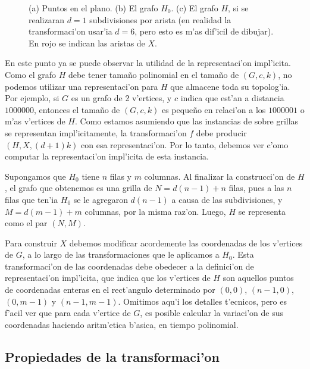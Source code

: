\begin{figure}[h]
	\begin{center}
		
	\end{center}		
	\caption{(a) Puntos en el plano. (b) El grafo $H_0$. (c) El grafo $H$, si se realizaran $d = 1$ subdivisiones por arista (en realidad la transformaci'on usar'ia $d = 6$, pero esto es m'as dif'icil de dibujar). En rojo se indican las aristas de $X$.}
	\label{fig:complejidad_1}
\end{figure}

En este punto ya se puede observar la utilidad de la representaci'on impl'icita. Como el grafo $H$ debe tener tama\~no polinomial en el tama\~no de $(G, c, k)$, no podemos utilizar una representaci'on para $H$ que almacene toda su topolog'ia. Por ejemplo, si $G$ es un grafo de 2 v'ertices, y $c$ indica que est'an a distancia $1000000$, entonces el tama\~no de $(G, c, k)$ es peque\~no en relaci'on a los $1000001$ o m'as v'ertices de $H$. Como estamos asumiendo que las instancias de  sobre grillas se representan impl'icitamente, la transformaci'on $f$ debe producir $(H, X, (d + 1)k)$ con esa representaci'on. Por lo tanto, debemos ver c'omo computar la representaci'on impl'icita de esta instancia.

Supongamos que $H_0$ tiene $n$ filas y $m$ columnas. Al finalizar la construcci'on de $H$, el grafo que obtenemos es una grilla de $N = d(n - 1) + n$ filas, pues a las $n$ filas que ten'ia $H_0$ se le agregaron $d(n - 1)$ a causa de las subdivisiones, y $M = d(m - 1) + m$ columnas, por la misma raz'on. Luego, $H$ se representa como el par $(N, M)$.

Para construir $X$ debemos modificar acordemente las coordenadas de los v'ertices de $G$, a lo largo de las transformaciones que le aplicamos a $H_0$. Esta transformaci'on de las coordenadas debe obedecer a la definici'on de representaci'on impl'icita, que indica que los v'ertices de $H$ son aquellos puntos de coordenadas enteras en el rect'angulo determinado por $(0, 0)$, $(n - 1, 0)$, $(0, m - 1)$ y $(n - 1, m - 1)$. Omitimos aqu'i los detalles t'ecnicos, pero es f'acil ver que para cada v'ertice de $G$, es posible calcular la variaci'on de sus coordenadas haciendo aritm'etica b'asica, en tiempo polinomial.

\subsection{Propiedades de la transformaci'on}

